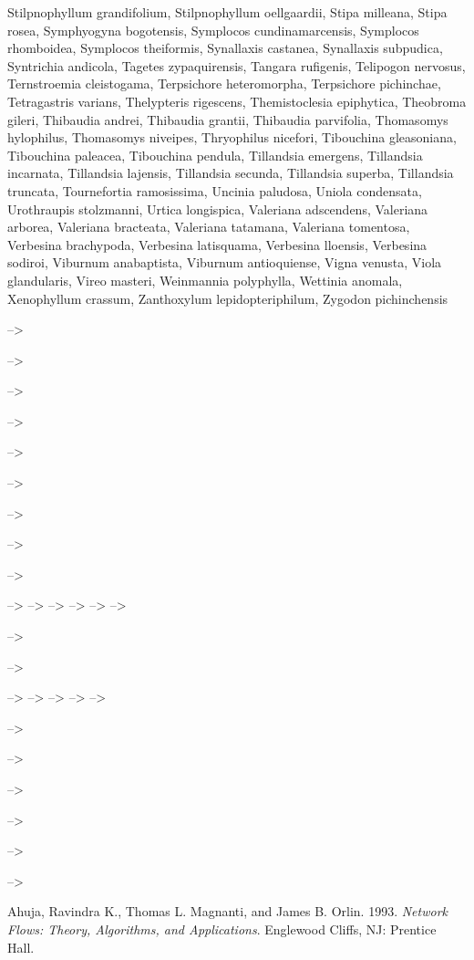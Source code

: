 \documentclass[]{article}
\begin{document}
Stilpnophyllum grandifolium, Stilpnophyllum oellgaardii, Stipa milleana, Stipa rosea, Symphyogyna bogotensis, Symplocos cundinamarcensis, Symplocos rhomboidea, Symplocos theiformis, Synallaxis castanea, Synallaxis subpudica, Syntrichia andicola, Tagetes zypaquirensis, Tangara rufigenis, Telipogon nervosus, Ternstroemia cleistogama, Terpsichore heteromorpha, Terpsichore pichinchae, Tetragastris varians, Thelypteris rigescens, Themistoclesia epiphytica, Theobroma gileri, Thibaudia andrei, Thibaudia grantii, Thibaudia parvifolia, Thomasomys hylophilus, Thomasomys niveipes, Thryophilus nicefori, Tibouchina gleasoniana, Tibouchina paleacea, Tibouchina pendula, Tillandsia emergens, Tillandsia incarnata, Tillandsia lajensis, Tillandsia secunda, Tillandsia superba, Tillandsia truncata, Tournefortia ramosissima, Uncinia paludosa, Uniola condensata, Urothraupis stolzmanni, Urtica longispica, Valeriana adscendens, Valeriana arborea, Valeriana bracteata, Valeriana tatamana, Valeriana tomentosa, Verbesina brachypoda, Verbesina latisquama, Verbesina lloensis, Verbesina sodiroi, Viburnum anabaptista, Viburnum antioquiense, Vigna venusta, Viola glandularis, Vireo masteri, Weinmannia polyphylla, Wettinia anomala, Xenophyllum crassum, Zanthoxylum lepidopteriphilum, Zygodon pichinchensis

--\textgreater{}

--\textgreater{}

--\textgreater{}

--\textgreater{}

--\textgreater{}

--\textgreater{}

--\textgreater{}

--\textgreater{}

--\textgreater{}

--\textgreater{}
 --\textgreater{}
 --\textgreater{}
 --\textgreater{}
 --\textgreater{}
 --\textgreater{}

--\textgreater{}

--\textgreater{}

--\textgreater{}
 --\textgreater{}
 --\textgreater{}
 --\textgreater{}
 --\textgreater{}

--\textgreater{}

--\textgreater{}

--\textgreater{}

--\textgreater{}

--\textgreater{}

--\textgreater{}

\hypertarget{refs}{}
\leavevmode\hypertarget{ref-Ahuja93}{}%
Ahuja, Ravindra K., Thomas L. Magnanti, and James B. Orlin. 1993. \emph{Network Flows: Theory, Algorithms, and Applications}. Englewood Cliffs, NJ: Prentice Hall.
\end{document}
